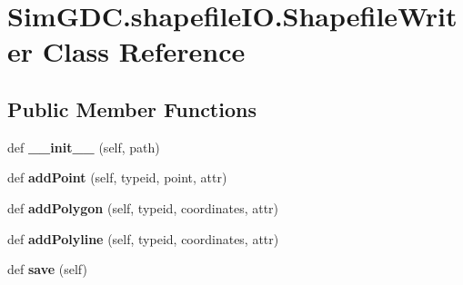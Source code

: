 \hypertarget{class_sim_g_d_c_1_1shapefile_i_o_1_1_shapefile_writer}{}\section{Sim\+G\+D\+C.\+shapefile\+I\+O.\+Shapefile\+Writer Class Reference}
\label{class_sim_g_d_c_1_1shapefile_i_o_1_1_shapefile_writer}
\subsection*{Public Member Functions}
\begin{DoxyCompactItemize}
\item 
\hypertarget{class_sim_g_d_c_1_1shapefile_i_o_1_1_shapefile_writer_a3103186744e4bff48bb15d2ee646b0dd}{}def {\bfseries \+\_\+\+\_\+init\+\_\+\+\_\+} (self, path)\label{class_sim_g_d_c_1_1shapefile_i_o_1_1_shapefile_writer_a3103186744e4bff48bb15d2ee646b0dd}

\item 
\hypertarget{class_sim_g_d_c_1_1shapefile_i_o_1_1_shapefile_writer_a9d2de70bd7f040ce2c7e86a0f156e3f7}{}def {\bfseries add\+Point} (self, typeid, point, attr)\label{class_sim_g_d_c_1_1shapefile_i_o_1_1_shapefile_writer_a9d2de70bd7f040ce2c7e86a0f156e3f7}

\item 
\hypertarget{class_sim_g_d_c_1_1shapefile_i_o_1_1_shapefile_writer_addc5d74c757899a857d40ca9586632f1}{}def {\bfseries add\+Polygon} (self, typeid, coordinates, attr)\label{class_sim_g_d_c_1_1shapefile_i_o_1_1_shapefile_writer_addc5d74c757899a857d40ca9586632f1}

\item 
\hypertarget{class_sim_g_d_c_1_1shapefile_i_o_1_1_shapefile_writer_a1f7d00798043e1f3eebeb7f0818798d3}{}def {\bfseries add\+Polyline} (self, typeid, coordinates, attr)\label{class_sim_g_d_c_1_1shapefile_i_o_1_1_shapefile_writer_a1f7d00798043e1f3eebeb7f0818798d3}

\item 
\hypertarget{class_sim_g_d_c_1_1shapefile_i_o_1_1_shapefile_writer_a5ffba693310b978849b3a575b473982d}{}def {\bfseries save} (self)\label{class_sim_g_d_c_1_1shapefile_i_o_1_1_shapefile_writer_a5ffba693310b978849b3a575b473982d}

\end{DoxyCompactItemize}
